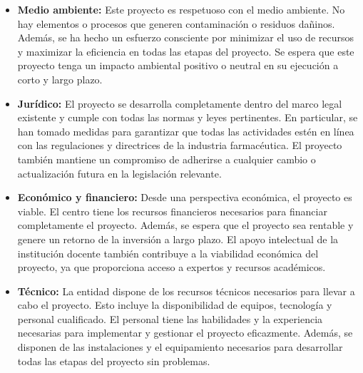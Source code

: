 \begin{itemize}
    \item \textbf{Medio ambiente:} Este proyecto es respetuoso con el medio ambiente. No hay elementos o procesos
          que generen contaminación o residuos dañinos. Además, se ha hecho un esfuerzo consciente por minimizar el uso
          de recursos y maximizar la eficiencia en todas las etapas del proyecto. Se espera que este proyecto tenga un
          impacto ambiental positivo o neutral en su ejecución a corto y largo plazo.

    \item \textbf{Jurídico:} El proyecto se desarrolla completamente dentro del marco legal existente y cumple con
          todas las normas y leyes pertinentes. En particular, se han tomado medidas para garantizar que todas las
          actividades estén en línea con las regulaciones y directrices de la industria farmacéutica. El proyecto también
          mantiene un compromiso de adherirse a cualquier cambio o actualización futura en la legislación relevante.

    \item \textbf{Económico y financiero:} Desde una perspectiva económica, el proyecto es viable. El centro tiene
          los recursos financieros necesarios para financiar completamente el proyecto. Además, se espera que el proyecto
          sea rentable y genere un retorno de la inversión a largo plazo. El apoyo intelectual de la institución docente
          también contribuye a la viabilidad económica del proyecto, ya que proporciona acceso a expertos y recursos
          académicos.

    \item \textbf{Técnico:} La entidad dispone de los recursos técnicos necesarios para llevar a cabo el proyecto.
          Esto incluye la disponibilidad de equipos, tecnología y personal cualificado. El personal tiene las habilidades
          y la experiencia necesarias para implementar y gestionar el proyecto eficazmente. Además, se disponen de las
          instalaciones y el equipamiento necesarios para desarrollar todas las etapas del proyecto sin problemas.
\end{itemize}









